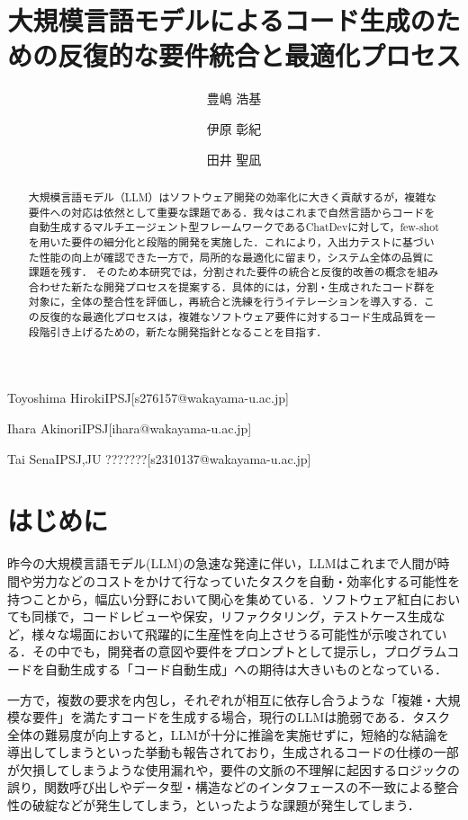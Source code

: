\documentclass[submit,techrep,noauthor]{ipsj}
\begin{document}
\title{大規模言語モデルによるコード生成のための反復的な要件統合と最適化プロセス\\}




\author{豊嶋 浩基}{Toyoshima Hiroki}{IPSJ}[s276157@wakayama-u.ac.jp]
\author{伊原 彰紀}{Ihara Akinori}{IPSJ}[ihara@wakayama-u.ac.jp]
\author{田井 聖凪}{Tai Sena}{IPSJ,JU ???????}[s2310137@wakayama-u.ac.jp]

\begin{abstract}
大規模言語モデル（LLM）はソフトウェア開発の効率化に大きく貢献するが，複雑な要件への対応は依然として重要な課題である．我々はこれまで自然言語からコードを自動生成するマルチエージェント型フレームワークであるChatDevに対して，few-shotを用いた要件の細分化と段階的開発を実施した．これにより，入出力テストに基づいた性能の向上が確認できた一方で，局所的な最適化に留まり，システム全体の品質に課題を残す．
そのため本研究では，分割された要件の統合と反復的改善の概念を組み合わせた新たな開発プロセスを提案する．具体的には，分割・生成されたコード群を対象に，全体の整合性を評価し，再統合と洗練を行うイテレーションを導入する．この反復的な最適化プロセスは，複雑なソフトウェア要件に対するコード生成品質を一段階引き上げるための，新たな開発指針となることを目指す．

\end{abstract}


\maketitle

\section{はじめに}
昨今の大規模言語モデル(LLM)の急速な発達に伴い，LLMはこれまで人間が時間や労力などのコストをかけて行なっていたタスクを自動・効率化する可能性を持つことから，幅広い分野において関心を集めている．ソフトウェア紅白においても同様で，コードレビューや保安，リファクタリング，テストケース生成など，様々な場面において飛躍的に生産性を向上させうる可能性が示唆されている．その中でも，開発者の意図や要件をプロンプトとして提示し，プログラムコードを自動生成する「コード自動生成」への期待は大きいものとなっている．

一方で，複数の要求を内包し，それぞれが相互に依存し合うような「複雑・大規模な要件」を満たすコードを生成する場合，現行のLLMは脆弱である．タスク全体の難易度が向上すると，LLMが十分に推論を実施せずに，短絡的な結論を導出してしまうといった挙動も報告されており，生成されるコードの仕様の一部が欠損してしまうような使用漏れや，要件の文脈の不理解に起因するロジックの誤り，関数呼び出しやデータ型・構造などのインタフェースの不一致による整合性の破綻などが発生してしまう，といったような課題が発生してしまう．
\end{document}
